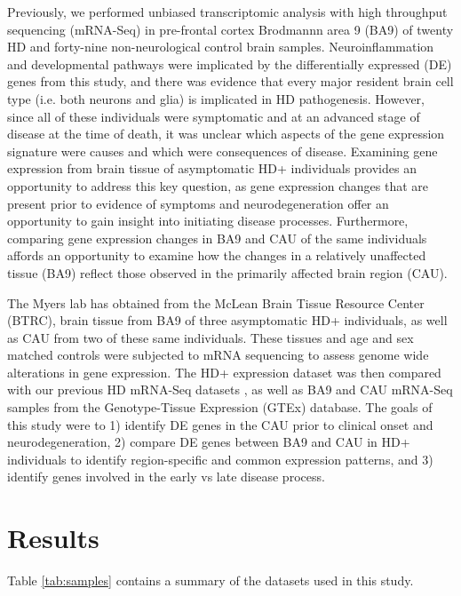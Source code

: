 \documentclass[fleqn,10pt,table]{wlscirep}
\begin{document}
Previously, we performed unbiased transcriptomic analysis with high throughput sequencing (mRNA-Seq) in pre-frontal cortex Brodmannn area 9 (BA9) of twenty HD and forty-nine non-neurological control brain samples\cite{Labadorf2015-zf}.
Neuroinflammation and developmental pathways were implicated by the differentially expressed (DE) genes from this study, and there was evidence that every major resident brain cell type (i.e. both neurons and glia) is implicated in HD pathogenesis.
However, since all of these individuals were symptomatic and at an advanced stage of disease at the time of death, it was unclear which aspects of the gene expression signature were causes and which were consequences of disease.
Examining gene expression from brain tissue of asymptomatic HD+ individuals provides an opportunity to address this key question, as gene expression changes that are present prior to evidence of symptoms and neurodegeneration offer an opportunity to gain insight into initiating disease processes.
Furthermore, comparing gene expression changes in BA9 and CAU of the same individuals affords an opportunity to examine how the changes in a relatively unaffected tissue (BA9) reflect those observed in the primarily affected brain region (CAU).

The Myers lab has obtained from the McLean Brain Tissue Resource Center (BTRC), brain tissue from BA9 of three asymptomatic HD+ individuals, as well as CAU from two of these same individuals.
These tissues and age and sex matched controls were subjected to mRNA sequencing to assess genome wide alterations in gene expression.
The HD+ expression dataset was then compared with our previous HD mRNA-Seq datasets \cite{Labadorf2017-qb}, as well as BA9 and CAU mRNA-Seq samples from the Genotype-Tissue Expression (GTEx) database.
The goals of this study were to 1) identify DE genes in the CAU prior to clinical onset and neurodegeneration, 2) compare DE genes between BA9 and CAU in HD+ individuals to identify region-specific and common expression patterns, and 3) identify genes involved in the early vs late disease process.

\section{Results}

Table \ref{tab:samples} contains a summary of the datasets used in this study.
\end{document}
